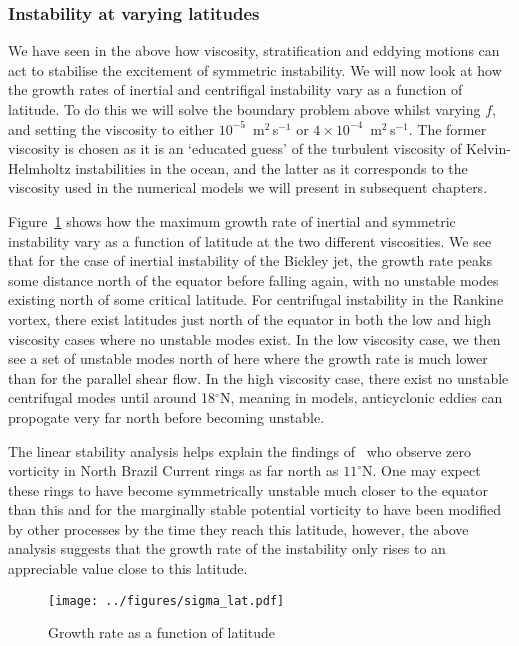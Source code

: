 \subsubsection{Instability at varying latitudes}
We have seen in the above how viscosity, stratification and eddying motions can act to stabilise the excitement of symmetric instability. We will now look at how the growth rates of inertial and centrifigal instability vary as a function of latitude. To do this we will solve the boundary problem above whilst varying $f$, and setting the viscosity to either $10^{-5}$~m$^{2}\,$s$^{-1}$ or $4 \times 10^{-4}$~m$^{2}\,$s$^{-1}$. The former viscosity is chosen as it is an `educated guess' of the turbulent viscosity of Kelvin-Helmholtz instabilities in the ocean, and the latter as it corresponds to the viscosity used in the numerical models we will present in subsequent chapters.

Figure~\ref{fig:SigmaAndLat} shows how the maximum growth rate of inertial and symmetric instability vary as a function of latitude at the two different viscosities. We see that for the case of inertial instability of the Bickley jet, the growth rate peaks some distance north of the equator before falling again, with no unstable modes existing north of some critical latitude. For centrifugal instability in the Rankine vortex, there exist latitudes just north of the equator in both the low and high viscosity cases where no unstable modes exist. In the low viscosity case, we then see a set of unstable modes north of here where the growth rate is much lower than for the parallel shear flow. In the high viscosity case, there exist no unstable centrifugal modes until around 18$^\circ$N, meaning in models, anticyclonic eddies can propogate very far north before becoming unstable.

The linear stability analysis helps explain the findings of~\citet{Castelao2011} who observe zero vorticity in North Brazil Current rings as far north as $11^\circ$N. One may expect these rings to have become symmetrically unstable much closer to the equator than this and for the marginally stable potential vorticity to have been modified by other processes by the time they reach this latitude, however, the above analysis suggests that the growth rate of the instability only rises to an appreciable value close to this latitude.

\begin{figure}
    \centering
    \texttt{[image: ../figures/sigma\_lat.pdf]}
    \caption{Growth rate as a function of latitude }
    \label{fig:SigmaAndLat}
\end{figure}

